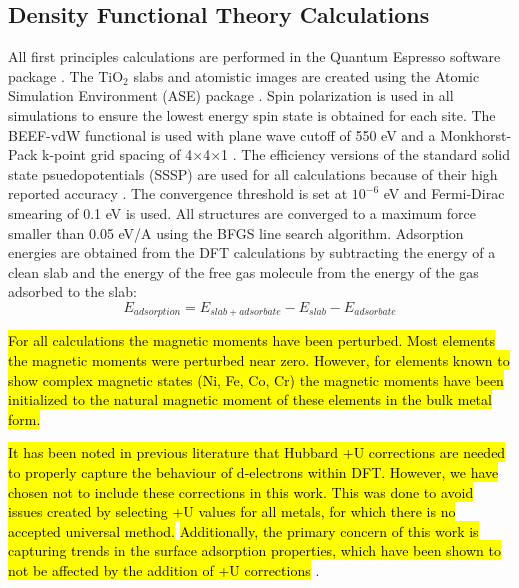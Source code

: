 \subsection{Density Functional Theory Calculations}
All first principles calculations are performed in the Quantum Espresso software package \cite{QE-2009}.
The TiO$_2$ slabs and atomistic images are created using the Atomic Simulation Environment (ASE) package \cite{ase-paper}.  Spin polarization is used in all simulations to ensure the lowest energy spin state is obtained for each site. The BEEF-vdW functional \cite{Wellendorff_2012} is used with plane wave cutoff of 550 eV and a Monkhorst-Pack k-point grid spacing of 4$\times$4$\times$1 \cite{Monkhorst_1976}. The efficiency versions of the standard solid state psuedopotentials \cite{SSSP_pseudos} (SSSP) are used for all calculations because of their high reported accuracy \cite{Lejaeghereaad3000}. The convergence threshold is set at $10^{-6}$ eV and Fermi-Dirac smearing of 0.1 eV is used. All structures are converged to a maximum force smaller than 0.05 eV/A using the BFGS line search algorithm. Adsorption energies are obtained from the DFT calculations by subtracting the energy of a clean slab and the energy of the free gas molecule from the energy of the gas adsorbed to the slab:
\begin{equation}
E_{adsorption} = E_{slab+adsorbate} - E_{slab} - E_{adsorbate}
\end{equation}

\hl{For all calculations the magnetic moments have been perturbed. Most elements the magnetic moments were perturbed near zero. However, for elements known to show complex magnetic states (Ni, Fe, Co, Cr) the magnetic moments have been initialized to the natural magnetic moment of these elements in the bulk metal form.}

\hl{It has been noted in previous literature that Hubbard +U corrections are needed  to properly capture the behaviour of d-electrons within DFT}\cite{Anisimov_1991}\hl{. However, we have chosen not to include these corrections in this work. This was done to avoid issues created by selecting +U values for all metals, for which there is no accepted universal method.} \cite{Xu_2015, Garc_a_Mota_2012}\hl{ Additionally, the primary concern of this work is capturing trends in the surface adsorption properties, which have been shown to not be affected by the addition of +U corrections} \cite{Xu_2015}.

